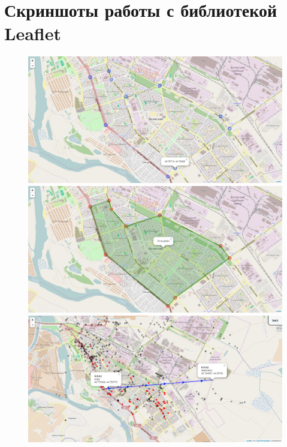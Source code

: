 \documentclass[a4paper, 14pt]{extreport}
\begin{document}
    \chapter{Скриншоты работы с библиотекой Leaflet}
    \begin{figure}[ht!]
        \center
        \includegraphics[width=.9\textwidth]{e1} \\[.5em]
        \includegraphics[width=.9\textwidth]{e2} \\[.5em]
        \includegraphics[width=.9\textwidth]{e3}
    \end{figure}
\end{document}
